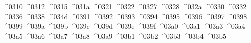 {  ^^^^0310%
  ^^^^0312%
  ^^^^0315%
  ^^^^031a%
  ^^^^0321%
  ^^^^0322%
  ^^^^0327%
  ^^^^0328%
  ^^^^032a%
  ^^^^0330%
  ^^^^0332%
  ^^^^0336%
  ^^^^0338%
  ^^^^034d%
  ^^^^0391%
  ^^^^0392%
  ^^^^0393%
  ^^^^0394%
  ^^^^0395%
  ^^^^0396%
  ^^^^0397%
  ^^^^0398%
  ^^^^0399%
  ^^^^039a%
  ^^^^039b%
  ^^^^039c%
  ^^^^039d%
  ^^^^039e%
  ^^^^039f%
  ^^^^03a0%
  ^^^^03a1%
  ^^^^03a3%
  ^^^^03a4%
  ^^^^03a5%
  ^^^^03a6%
  ^^^^03a7%
  ^^^^03a8%
  ^^^^03a9%
  ^^^^03b1%
  ^^^^03b2%
  ^^^^03b3%
  ^^^^03b4%
  ^^^^03b5%
}
